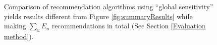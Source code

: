 \documentclass{sig-alternate}
\begin{document}
\begin{figure}[h]
  \begin{center}
  \end{center}
  \caption{Comparison of recommendation algorithms using ``global sensitivity'' yields results different from Figure \ref{fig:summaryResults} while making $\sum_u E_u$ recommendations in total (See Section \ref{Evaluation method}).}
  \label{fig:linkPredictionEvaluation}
\end{figure}
\end{document}
